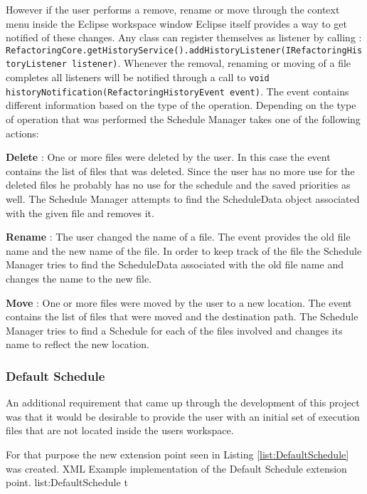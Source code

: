 However if the user performs a remove, rename or move through the context menu inside the Eclipse workspace window
Eclipse itself provides a way to get notified of these changes. Any class can register themselves as listener
by calling : 
\lstinline|RefactoringCore.getHistoryService().addHistoryListener(IRefactoringHistoryListener listener)|.
Whenever the removal, renaming or moving of a file completes all listeners will be notified through a call to
\lstinline|void historyNotification(RefactoringHistoryEvent event)|. The event contains different information
based on the type of the operation. Depending on the type of operation that was performed the Schedule Manager
takes one of the following actions:
\begin{description}
 \item \textbf{Delete} : One or more files were deleted by the user. In this case the event contains the list
of files that was deleted. Since the user has no more use for the deleted files he probably has no use for
the schedule and the saved priorities as well. The Schedule Manager attempts to find the ScheduleData object
associated with the given file and removes it.
 \item \textbf{Rename} : The user changed the name of a file. The event provides the old file name and the 
new name of the file. In order to keep track of the file the Schedule Manager tries to find the ScheduleData
associated with the old file name and changes the name to the new file.
 \item \textbf{Move} : One or more files were moved by the user to a new location. The event contains the list
of files that were moved and the destination path. The Schedule Manager tries to find a Schedule for each
of the files involved and changes its name to reflect the new location.
\end{description}


\subsubsection{Default Schedule}
\label{section:DefaultSchedule}
An additional requirement that came up through the development of this project was that it would
be desirable to provide the user with an initial set of execution files that are not located inside
the users workspace.

For that purpose the new extension point seen in Listing \ref{list:DefaultSchedule} was created.
\listingxml
{}
{XML}
{Example implementation of the Default Schedule extension point.}
{list:DefaultSchedule}
{t}

